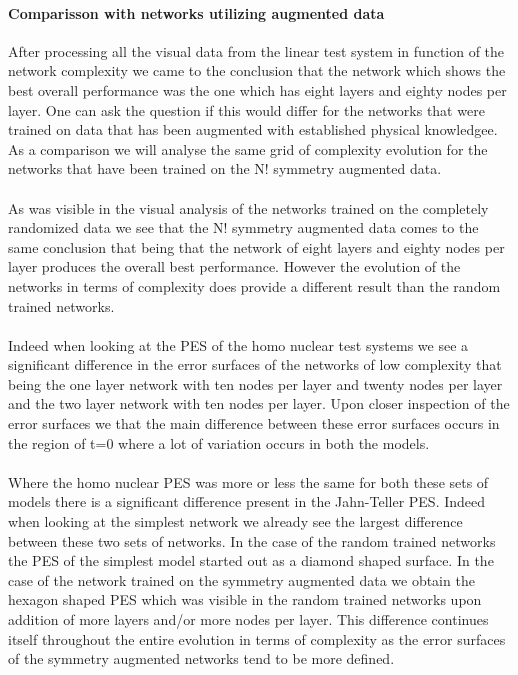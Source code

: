 \documentclass[]{article}
\begin{document}
\paragraph{Comparisson with networks utilizing augmented data}

After processing all the visual data from the linear test system in function of the network complexity we came to the conclusion that the network which shows the best overall performance was the one which has eight layers and eighty nodes per layer. One can ask the question if this would differ for the networks that were trained on data that has been augmented with established physical knowledgee. As a comparison we will analyse the same grid of complexity evolution for the networks that have been trained on the N! symmetry augmented data.
\\
\\
As was visible in the visual analysis of the networks trained on the completely randomized data we see that the N! symmetry augmented data comes to the same conclusion that being that the network of eight layers and eighty nodes per layer produces the overall best performance. However the evolution of the networks in terms of complexity does provide a different result than the random trained networks.
\\
\\
Indeed when looking at the PES of the homo nuclear test systems we see a significant difference in the error surfaces of the networks of low complexity that being the one layer network with ten nodes per layer and twenty nodes per layer and the two layer network with ten nodes per layer. Upon closer inspection of the error surfaces we that the main difference between these error surfaces occurs in the region of t=0 where a lot of variation occurs in both the models. 
\\
\\
Where the homo nuclear PES was more or less the same for both these sets of models there is a significant difference present in the Jahn-Teller PES. Indeed when looking at the simplest network we already see the largest difference between these two sets of networks. In the case of the random trained networks the PES of the simplest model started out as a diamond shaped surface. In the case of the network trained on the symmetry augmented data we obtain the hexagon shaped PES which was visible in the random trained networks upon addition of more layers and/or more nodes per layer. This difference continues itself throughout the entire evolution in terms of complexity as the error surfaces of the symmetry augmented networks tend to be more defined.
\end{document}

